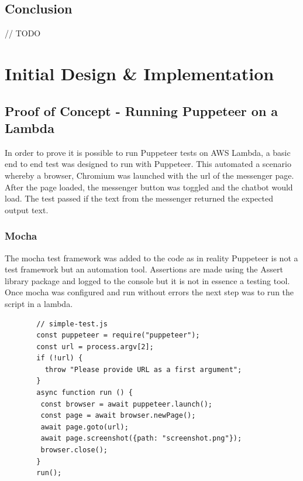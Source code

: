 \documentclass[12pt,a4paper,titlepage]{report}
\begin{document}
\section{Conclusion}
// TODO

\chapter{Initial Design \& Implementation}

\section{Proof of Concept - Running Puppeteer on a Lambda}

In order to prove it is possible to run Puppeteer tests on AWS Lambda, a basic end to end test was designed
to run with Puppeteer. This automated a scenario whereby a browser, Chromium was launched with the url of the
messenger page. After the page loaded, the messenger button was toggled and the chatbot would load. The test
passed if the text from the messenger returned the expected output text.

\subsection{Mocha}

The mocha test framework was added to the code as in reality Puppeteer is not a test framework but an automation tool.
Assertions are made using the Assert library package and logged to the console but it is not in essence a testing tool.
Once mocha was configured and run without errors the next step was to run the script in a lambda.

\begin{figure}[H]
 \begin{tcolorbox}
  \begin{verbatim}
  // simple-test.js
  const puppeteer = require("puppeteer");
  const url = process.argv[2];
  if (!url) {
    throw "Please provide URL as a first argument";
  }
  async function run () {
   const browser = await puppeteer.launch();
   const page = await browser.newPage();
   await page.goto(url);
   await page.screenshot({path: "screenshot.png"});
   browser.close();
  }
  run();
\end{verbatim}
\end{tcolorbox}
\end{figure}
\end{document}
